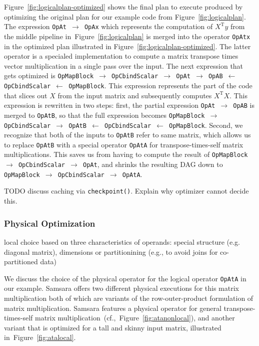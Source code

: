 \documentclass{article}
\begin{document}
Figure~\ref{fig:logicalplan-optimized} shows the final plan to execute produced by optimizing the original plan for our example code from Figure~\ref{fig:logicalplan}. The expression \texttt{OpAt $\rightarrow$ OpAx} which represents the computation of $X^\mathrm{T}y$ from the middle pipeline in~Figure~\ref{fig:logicalplan} is merged into the operator \texttt{OpAtx} in the optimized plan illustrated in Figure~\ref{fig:logicalplan-optimized}. The latter operator is a specialed implementation to compute a matrix transpose times vector multiplication in a single pass over the input. The next expression that gets optimized is \texttt{OpMapBlock $\rightarrow$ OpCbindScalar $\rightarrow$ OpAt $\rightarrow$ OpAB $\leftarrow$ OpCbindScalar $\leftarrow$ OpMapBlock}. This expression represents the part of the code that slices out $X$ from the input matrix and subsequently computes $X^\mathrm{T}X$. This expression is rewritten in two steps: first, the partial expression \texttt{OpAt $\rightarrow$ OpAB} is merged to \texttt{OpAtB}, so that the full expression becomes \texttt{OpMapBlock $\rightarrow$ OpCbindScalar $\rightarrow$ OpAtB $\leftarrow$ OpCbindScalar $\leftarrow$ OpMapBlock}. Second, we recognize that both of the inputs to \texttt{OpAtB} refer to same matrix, which allows us to replace \texttt{OpAtB} with a special operator \texttt{OpAtA} for transpose-times-self matrix multiplications. This saves us from having to compute the result of \texttt{OpMapBlock $\rightarrow$ OpCbindScalar $\rightarrow$ OpAt}, and shrinks the resulting DAG down to \texttt{OpMapBlock $\rightarrow$ OpCbindScalar $\rightarrow$ OpAtA}.

TODO discuss caching via \texttt{checkpoint()}. Explain why optimizer cannot decide this.

\subsubsection{Physical Optimization}

local choice based on three characteristics of operands: special structure (e.g. diagonal matrix), dimensions or partitionining (e.g., to avoid joins for co-partitioned data)

We discuss the choice of the physical operator for the logical operator \texttt{OpAtA} in our example. Samsara offers two different physical executions for this matrix multiplication both of which are variants of the row-outer-product formulation of matrix multiplication. Samsara features a physical operator for general transpose-times-self matrix multiplication~(cf.,~Figure~\ref{fig:atanonlocal}), and another variant that is optimized for a tall and skinny input matrix, illustrated in~Figure~\ref{fig:atalocal}.
\end{document}
